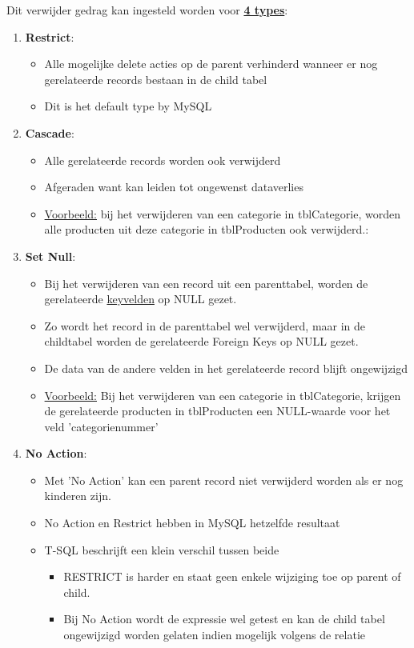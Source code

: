 \documentclass{article}
\newcommand{\bold}[1]{\textbf{#1}}
\begin{document}
Dit verwijder gedrag kan ingesteld worden voor \underline{\bold{4 types}}:

\begin{enumerate}
    \item \bold{Restrict}:
    \begin{itemize}
        \item Alle mogelijke delete acties op de parent verhinderd wanneer er nog gerelateerde records bestaan in de child tabel
        \item Dit is het default type by MySQL
    \end{itemize}
    \item \bold{Cascade}:
    \begin{itemize}
        \item Alle gerelateerde records worden ook verwijderd
        \item Afgeraden want kan leiden tot ongewenst dataverlies
        \item \underline{Voorbeeld:} bij het verwijderen van een categorie in tblCategorie, worden alle producten uit deze categorie in tblProducten ook verwijderd.:
    \end{itemize}
    \item \bold{Set Null}:
    \begin{itemize}
        \item Bij het verwijderen van een record uit een parenttabel, worden de gerelateerde \underline{keyvelden} op NULL gezet.
        \item Zo wordt het record in de parenttabel wel verwijderd, maar in de childtabel worden de gerelateerde Foreign Keys op NULL gezet.
        \item De data van de andere velden in het gerelateerde record blijft ongewijzigd
        \item \underline{Voorbeeld:} Bij het verwijderen van een categorie in tblCategorie, krijgen de gerelateerde producten in tblProducten een NULL-waarde voor het veld 'categorienummer'
    \end{itemize}
    \item \bold{No Action}:
    \begin{itemize}
        \item Met 'No Action' kan een parent record niet verwijderd worden als er nog kinderen zijn.
        \item No Action en Restrict hebben in MySQL hetzelfde resultaat
        \item T-SQL beschrijft een klein verschil tussen beide
        \begin{itemize}
            \item RESTRICT is harder en staat geen enkele wijziging toe op parent of child.
            \item Bij No Action wordt de expressie wel getest en kan de child tabel ongewijzigd worden gelaten indien mogelijk volgens de relatie 
        \end{itemize}
    \end{itemize}
\end{enumerate}
\end{document}
